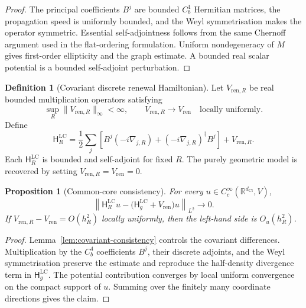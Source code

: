\documentclass[11pt]{article}
\newtheorem{proposition}[theorem]{Proposition}
\theoremstyle{definition}
\newtheorem{definition}[theorem]{Definition}
\theoremstyle{remark}
\newcommand{\R}{\mathbb{R}}
\newcommand{\dCl}{d_{\mathrm{Cl}}}
\newcommand{\Ham}{\mathsf{H}}
\begin{document}
\begin{proof}
The principal coefficients \(B^j\) are bounded \(C_b^1\) Hermitian matrices,
the propagation speed is uniformly bounded, and the Weyl symmetrisation makes
the operator symmetric.  Essential self-adjointness follows from the same
Chernoff argument used in the flat-ordering formulation.  Uniform
nondegeneracy of \(M\) gives first-order ellipticity and the graph estimate.
A bounded real scalar potential is a bounded self-adjoint perturbation.
\end{proof}

\begin{definition}[Covariant discrete renewal Hamiltonian]
\label{def:curved-discrete}
Let \(V_{\mathrm{ren},R}\) be real bounded multiplication operators satisfying
\[
  \sup_R\|V_{\mathrm{ren},R}\|_\infty<\infty,
  \qquad
  V_{\mathrm{ren},R}\longrightarrow V_{\mathrm{ren}}
  \quad\text{locally uniformly}.
\]
Define
\[
  \Ham_R^{\mathrm{LC}}
  =
  \frac12\sum_j
  \left[
    B^j(-i\nabla_{j,R})
    +
    (-i\nabla_{j,R})^\dagger B^j
  \right]
  +V_{\mathrm{ren},R}.
\]
Each \(\Ham_R^{\mathrm{LC}}\) is bounded and self-adjoint for fixed \(R\).
The purely geometric model is recovered by setting
\(V_{\mathrm{ren},R}=V_{\mathrm{ren}}=0\).
\end{definition}

\begin{proposition}[Common-core consistency]
\label{prop:curved-core-consistency}
For every \(u\in C_c^\infty(\R^{\dCl},V)\),
\[
  \left\|
    \Ham_R^{\mathrm{LC}}u
    -
    \bigl(\Ham_g^{\mathrm{LC}}+V_{\mathrm{ren}}\bigr)u
  \right\|_{L^2}
  \longrightarrow0 .
\]
If \(V_{\mathrm{ren},R}-V_{\mathrm{ren}}=O(h_R^2)\) locally uniformly, then
the left-hand side is \(O_u(h_R^2)\).
\end{proposition}

\begin{proof}
Lemma~\ref{lem:covariant-consistency} controls the covariant differences.
Multiplication by the \(C_b^4\) coefficients \(B^j\), their discrete adjoints,
and the Weyl symmetrisation preserve the estimate and reproduce the
half-density divergence term in \(\Ham_g^{\mathrm{LC}}\).  The potential
contribution converges by local uniform convergence on the compact support of
\(u\).  Summing over the finitely many coordinate directions gives the claim.
\end{proof}
\end{document}
